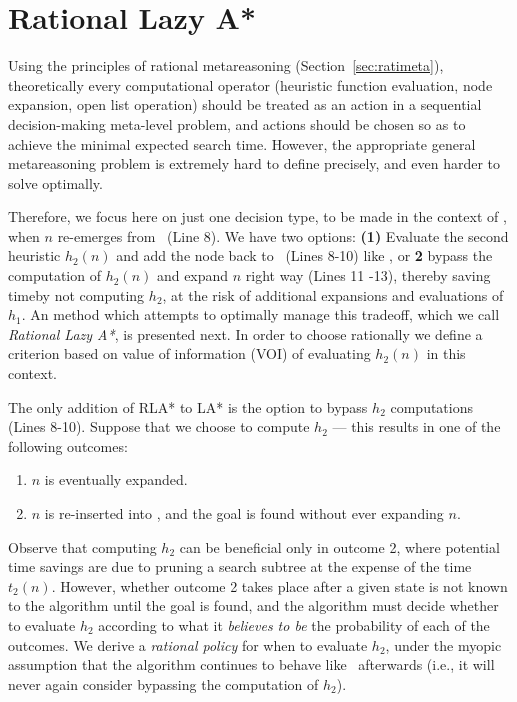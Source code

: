 \section{Rational Lazy A*}

Using the principles of rational metareasoning (Section~\ref{sec:ratimeta}),
theoretically every computational operator (heuristic function evaluation, node
expansion, open list operation) should be treated as an action in a sequential
decision-making meta-level problem, and actions should be chosen so as to
achieve the minimal expected search time. However, the appropriate
general metareasoning problem is extremely hard to define precisely, and even harder
to solve optimally.

Therefore, we focus here on just one decision type, to be
made in the context of \lazyastar, when $n$ re-emerges from \OPEN~(Line 8).
We have two options: {\bf (1)}  Evaluate the second heuristic $h_2(n)$ and add
the node back to \OPEN~(Lines 8-10) like \lazyastar, or {\bf 2} bypass the
computation of $h_2(n)$ and expand $n$ right way (Lines 11 -13), thereby
saving timeby not computing $h_2$, at the risk of additional expansions and evaluations of $h_1$.
An method which attempts to
optimally manage this tradeoff, which we call \textit{Rational Lazy A*}, is presented next.
In order to choose rationally we define a criterion based on value of
information (VOI) of evaluating $h_2(n)$ in this context.

The only addition of RLA* to LA* is the option to bypass $h_2$ computations (Lines 8-10).
Suppose that we choose to compute $h_2$ --- this results in one of the
following outcomes:
\begin{enumerate}
\item $n$ is eventually expanded.
\item $n$ is re-inserted into \OPEN, and the goal is found without ever expanding $n$.
\end{enumerate}

Observe that computing $h_2$ can be beneficial only in outcome 2, where
potential time savings are due to pruning a search subtree at the expense of
the time $t_2(n)$. However, whether outcome 2 takes place after a given state
is not known to the algorithm until the goal is found, and the algorithm must
decide whether to evaluate $h_2$ according to what it \textit{believes to be}
the probability of each of the outcomes. We derive a \textit{rational policy}
for when to evaluate $h_2$, under the myopic assumption that the algorithm
continues to behave like \lazyastar~afterwards (i.e., it will never again
consider bypassing the computation of $h_2$).

